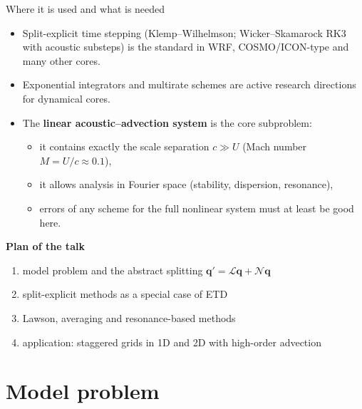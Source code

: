 \documentclass[aspectratio=169,10pt]{beamer}
\newcommand{\bq}{\mathbf{q}}
\newcommand{\LL}{\mathcal{L}}   %
\newcommand{\NN}{\mathcal{N}}   %
\begin{document}
	\begin{frame}{Where it is used and what is needed}
		\begin{itemize}
			\item Split-explicit time stepping (Klemp--Wilhelmson; Wicker--Skamarock RK3 with acoustic substeps) is the standard in WRF, COSMO/ICON-type and many other cores.
			\item Exponential integrators and multirate schemes are active research directions for dynamical cores.
			\item The \textbf{linear acoustic--advection system} is the core subproblem:
			\begin{itemize}
				\item it contains exactly the scale separation $c \gg U$ (Mach number $M=U/c\approx 0.1$),
				\item it allows analysis in Fourier space (stability, dispersion, resonance),
				\item errors of any scheme for the full nonlinear system must at least be good here.
			\end{itemize}
		\end{itemize}
		\vspace{0.5em}
		\textbf{Plan of the talk}
		\begin{enumerate}
			\item model problem and the abstract splitting $\bq'=\LL\bq+\NN\bq$
			\item split-explicit methods as a special case of ETD
			\item Lawson, averaging and resonance-based methods
			\item application: staggered grids in 1D and 2D with high-order advection
		\end{enumerate}
	\end{frame}
	
	\section{Model problem}
	
\end{document}
